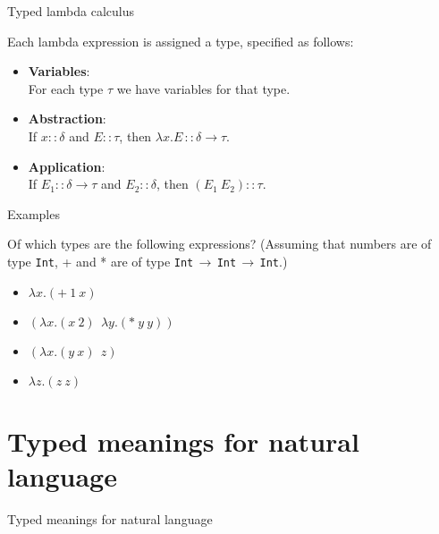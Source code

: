 \documentclass[xcolor=dvipsnames]{beamer}
\begin{document}
\begin{frame}{Typed lambda calculus}

Each lambda expression is assigned a type, 
specified as follows: 
\begin{itemize}
\item {\bf Variables}:\\ For each type {$\tau$} we have variables for that type.
\item {\bf Abstraction}:\\ If {$x::\delta$} and {$E::\tau$}, 
then {$\lambda x.E\,::\delta\rightarrow\tau$}.
\item {\bf Application}:\\ If {$E_1::\delta\rightarrow\tau$} and
{$E_2::\delta$}, then {$(E_1\ E_2)::\tau$}.
\end{itemize}
\end{frame}

\begin{frame}{Examples}

Of which types are the following expressions? 
(Assuming that numbers are of type {\tt Int}, + and * are of type {\tt Int}$\,\to\,${\tt Int}$\,\to\,${\tt Int}.) 
\begin{itemize}
\item $\lambda x.(+\ 1\ x)$
\item $(\lambda x.(x\ 2)\ \ \lambda y.(*\ y\ y))$
\item $(\lambda x.(y\ x)\ \ z)$
\item $\lambda z.(z\ z)$
\end{itemize}
\end{frame}



\section{Typed meanings for natural language}

\begin{frame}{}

\begin{center}{\Large Typed meanings for natural language}\end{center}
\end{frame}


%
\end{document}
